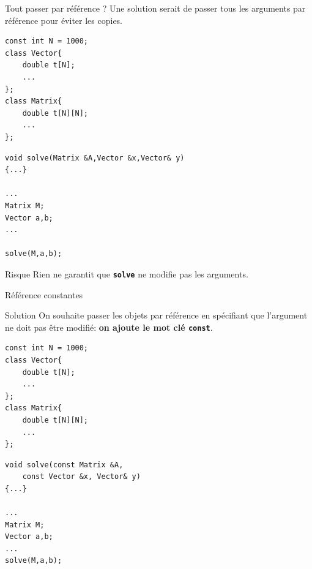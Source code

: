 \begin{frame}[fragile=singleslide]{Tout passer par référence ?}
Une solution serait de passer tous les arguments par référence pour éviter les copies.

    \begin{minipage}{0.44\linewidth}
            \begin{verbatim}
const int N = 1000;
class Vector{
    double t[N];
    ...
};
class Matrix{
    double t[N][N];
    ...
};
            \end{verbatim}
    \end{minipage}
    \hfill
    \begin{minipage}{0.50\linewidth}
            \begin{verbatim}
void solve(Matrix &A,Vector &x,Vector& y)
{...}

...
Matrix M;
Vector a,b;
...

solve(M,a,b);
            \end{verbatim}
    \end{minipage}

\begin{alertblock}{Risque}
    Rien ne garantit que \texttt{\textbf{solve}} ne modifie pas les arguments.
\end{alertblock}
\end{frame}

\begin{frame}[fragile=singleslide]{Référence constantes}
    \begin{block}{Solution}
        On souhaite passer les objets par référence en spécifiant que l'argument ne doit pas être modifié: \textbf{on ajoute le mot clé \texttt{const}}.
    \end{block}
    \begin{minipage}{0.44\linewidth}
            \begin{verbatim}
const int N = 1000;
class Vector{
    double t[N];
    ...
};
class Matrix{
    double t[N][N];
    ...
};
            \end{verbatim}
    \end{minipage}
    \hfill
    \begin{minipage}{0.50\linewidth}
            \begin{verbatim}
void solve(const Matrix &A,
    const Vector &x, Vector& y)
{...}

...
Matrix M;
Vector a,b;
...
solve(M,a,b);
            \end{verbatim}
    \end{minipage}
\end{frame}

